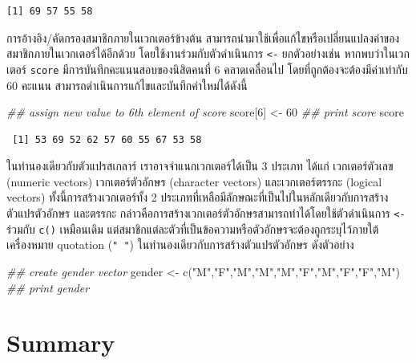 \documentclass[
  a4paper,
]{book}
\newenvironment{Shaded}{\begin{snugshade}}{\end{snugshade}}
\newcommand{\DecValTok}[1]{\textcolor[rgb]{0.68,0.00,0.00}{#1}}
\newcommand{\DocumentationTok}[1]{\textcolor[rgb]{0.37,0.37,0.37}{\textit{#1}}}
\newcommand{\FunctionTok}[1]{\textcolor[rgb]{0.28,0.35,0.67}{#1}}
\newcommand{\NormalTok}[1]{\textcolor[rgb]{0.00,0.23,0.31}{#1}}
\newcommand{\OtherTok}[1]{\textcolor[rgb]{0.00,0.23,0.31}{#1}}
\newcommand{\StringTok}[1]{\textcolor[rgb]{0.13,0.47,0.30}{#1}}
\begin{document}
\begin{verbatim}
[1] 69 57 55 58
\end{verbatim}

การอ้างอิง/คัดกรองสมาชิกภายในเวกเตอร์ข้างต้น
สามารถนำมาใช้เพื่อแก้ไขหรือเปลี่ยนแปลงค่าของสมาชิกภายในเวกเตอร์ได้อีกด้วย
โดยใช้งานร่วมกับตัวดำเนินการ \texttt{\textless{}-} ยกตัวอย่างเช่น
หากพบว่าในเวกเตอร์ \texttt{score} มีการบันทึกคะแนนสอบของนิสิตคนที่ 6 คลาดเคลื่อนไป
โดยที่ถูกต้องจะต้องมีค่าเท่ากับ 60 คะแนน สามารถดำเนินการแก้ไขและบันทึกค่าใหม่ได้ดังนี้

\begin{Shaded}
\begin{Highlighting}[]
\DocumentationTok{\#\# assign new value to 6th element of score}
\NormalTok{score[}\DecValTok{6}\NormalTok{] }\OtherTok{\textless{}{-}} \DecValTok{60}
\DocumentationTok{\#\# print score}
\NormalTok{score}
\end{Highlighting}
\end{Shaded}

\begin{verbatim}
 [1] 53 69 52 62 57 60 55 67 53 58
\end{verbatim}

ในทำนองเดียวกับตัวแปรสเกลาร์ เราอาจจำแนกเวกเตอร์ได้เป็น 3 ประเภท ได้แก่
เวกเตอร์ตัวเลข (numeric vectors) เวกเตอร์ตัวอักษร (character vectors)
และเวกเตอร์ตรรกะ (logical vectors) ทั้งนี้การสร้างเวกเตอร์ทั้ง 2
ประเภทที่เหลือมีลักษณะที่เป็นไปในหลักเดียวกับการสร้างตัวแปรตัวอักษร และตรรกะ
กล่าวคือการสร้างเวกเตอร์ตัวอักษรสามารถทำได้โดยใช้ตัวดำเนินการ
\texttt{\textless{}-} ร่วมกับ \texttt{c()} เหมือนเดิม
แต่สมาชิกแต่ละตัวที่เป็นข้อความหรือตัวอักษรจะต้องถูกระบุไว้ภายใต้เครื่องหมาย quotation
(\texttt{"\ "}) ในทำนองเดียวกับการสร้างตัวแปรตัวอักษร ดังตัวอย่าง

\begin{Shaded}
\begin{Highlighting}[]
\DocumentationTok{\#\# create gender vector}
\NormalTok{gender }\OtherTok{\textless{}{-}} \FunctionTok{c}\NormalTok{(}\StringTok{"M"}\NormalTok{,}\StringTok{"F"}\NormalTok{,}\StringTok{"M"}\NormalTok{,}\StringTok{"M"}\NormalTok{,}\StringTok{"M"}\NormalTok{,}\StringTok{"F"}\NormalTok{,}\StringTok{"M"}\NormalTok{,}\StringTok{"F"}\NormalTok{,}\StringTok{"F"}\NormalTok{,}\StringTok{"M"}\NormalTok{)}
\DocumentationTok{\#\# print gender}
\end{Highlighting}
\end{Shaded}


\chapter{Summary}\label{summary}
\end{document}
